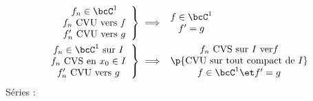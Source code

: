 \documentclass[a4paper,french,bookmarks]{book}
\begin{document}
    \begin{align*}
         \left.\begin{array}{c}
        f_n \in \bcC^1  \\
        f_n \ \text{CVU vers} \ f\\
        f_n' \ \text{CVU vers} \ g
    \end{array}\right\rbrace &\implies \begin{array}{c}
        f \in \bcC^1\\
        f' = g
    \end{array}\\
    \left.\begin{array}{c}
        f_n \in \bcC^1 \ \text{sur} \ I \\
        f_n \ \text{CVS en} \ x_0 \in I\\
        f_n' \ \text{CVU vers} \ g
    \end{array}\right\rbrace &\implies \begin{array}{c}
        f_n \ \text{CVS sur} \ I \ \text{ver} f\\
        \p{\text{CVU sur tout compact de} \ I}\\
        f \in \bcC^1 \et f' = g
    \end{array}
    \end{align*}
    Séries :
\end{document}
